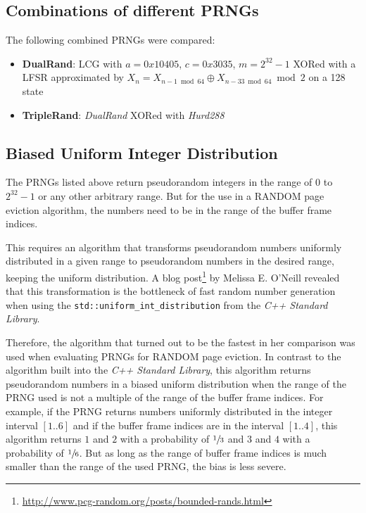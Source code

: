 \subsection[Combinations of different PRNGs]{Combinations of different PRNGs} \label{subsec:combination}

    The following combined PRNGs were compared:
    \begin{itemize}
        \itemsep0em
        \item \textbf{DualRand}: LCG with $a = 0x10405$, $c = 0x3035$, $m = 2^{32} - 1$ XORed with a LFSR approximated by $X_n = X_{n - 1 \bmod 64} \oplus X_{n - 33 \bmod 64} \bmod 2$ on a \SI{128}{\bit} state
        \item \textbf{TripleRand}: \textit{DualRand} XORed with \textit{Hurd288}
    \end{itemize}

\subsection[Biased Uniform Int Distribution]{Biased Uniform Integer Distribution} \label{subsec:distribution}

    The PRNGs listed above return pseudorandom integers in the range of $0$ to $2^{32} - 1$ or any other arbitrary range. But for the use in a RANDOM page eviction algorithm, the numbers need to be in the range of the buffer frame indices.

    This requires an algorithm that transforms pseudorandom numbers uniformly distributed in a given range to pseudorandom numbers in the desired range, keeping the uniform distribution. A blog post\footnote{\url{http://www.pcg-random.org/posts/bounded-rands.html}} by Melissa E. O'Neill revealed that this transformation is the bottleneck of fast random number generation when using the \lstinline|std::uniform_int_distribution| from the \textit{C++ Standard Library}.

    Therefore, the algorithm that turned out to be the fastest in her comparison was used when evaluating PRNGs for RANDOM page eviction. In contrast to the algorithm built into the \textit{C++ Standard Library}, this algorithm returns pseudorandom numbers in a biased uniform distribution when the range of the PRNG used is not a multiple of the range of the buffer frame indices. For example, if the PRNG returns numbers uniformly distributed in the integer interval $\left[1 .. 6\right]$ and if the buffer frame indices are in the interval $\left[1 .. 4\right]$, this algorithm returns $1$ and $2$ with a probability of $\sfrac{1}{3}$ and $3$ and $4$ with a probability of $\sfrac{1}{6}$. But as long as the range of buffer frame indices is much smaller than the range of the used PRNG, the bias is less severe.

